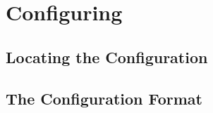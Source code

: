 

\section{Configuring \ExBib}

\subsection{Locating the Configuration}

\INCOMPLETE


\subsection{The Configuration Format}

\INCOMPLETE


\endinput
%
